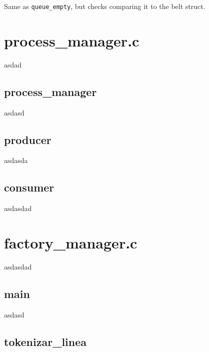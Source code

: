 \documentclass[es]{uc3mreport}
\begin{document}
\begin{report}
      \setcounter{subsubsection}{0}

      Same as \texttt{queue\_empty}, but checks comparing it to the belt
      struct.

      \section{process\_manager.c}

      \setcounter{subsection}{0}

      \setcounter{subsubsection}{0}

      asdad

      \subsection{process\_manager\(\)}

      \setcounter{subsubsection}{0}

      asdasd

      \subsection{producer\(\)}

      \setcounter{subsubsection}{0}

      asdasda

      \subsection{consumer\(\)}

      \setcounter{subsubsection}{0}

      asdasdad

      \section{factory\_manager.c}

      \setcounter{subsection}{0}

      \setcounter{subsubsection}{0}

      asdasdad

      \subsection{main\(\)}

      \setcounter{subsubsection}{0}

      asdasd

      \subsection{tokenizar\_linea\(\)}


\end{report}
\end{document}
